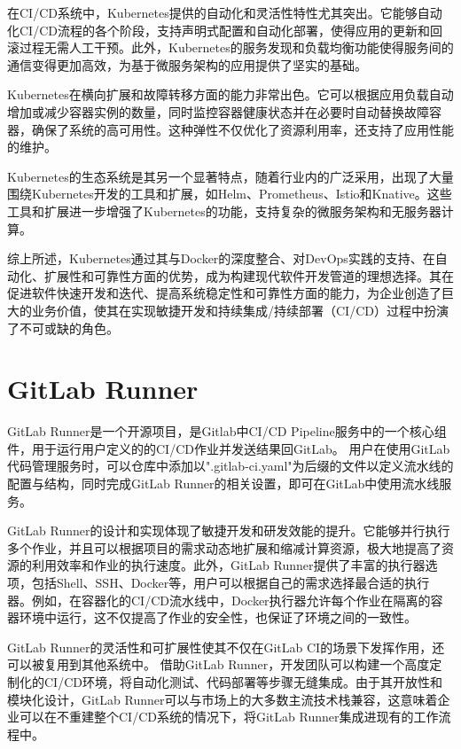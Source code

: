 在CI/CD系统中，Kubernetes提供的自动化和灵活性特性尤其突出\cite{janani2022analysis}。它能够自动化CI/CD流程的各个阶段，支持声明式配置和自动化部署，使得应用的更新和回滚过程无需人工干预。此外，Kubernetes的服务发现和负载均衡功能使得服务间的通信变得更加高效，为基于微服务架构的应用提供了坚实的基础。

Kubernetes在横向扩展和故障转移方面的能力非常出色\cite{JSSG201909023}。它可以根据应用负载自动增加或减少容器实例的数量，同时监控容器健康状态并在必要时自动替换故障容器，确保了系统的高可用性。这种弹性不仅优化了资源利用率，还支持了应用性能的维护。

Kubernetes的生态系统是其另一个显著特点，随着行业内的广泛采用，出现了大量围绕Kubernetes开发的工具和扩展，如Helm、Prometheus、Istio和Knative。这些工具和扩展进一步增强了Kubernetes的功能，支持复杂的微服务架构和无服务器计算。

综上所述，Kubernetes通过其与Docker的深度整合、对DevOps实践的支持、在自动化、扩展性和可靠性方面的优势，成为构建现代软件开发管道的理想选择。其在促进软件快速开发和迭代、提高系统稳定性和可靠性方面的能力，为企业创造了巨大的业务价值，使其在实现敏捷开发和持续集成/持续部署（CI/CD）过程中扮演了不可或缺的角色。


\section{GitLab Runner}
GitLab Runner是一个开源项目，是Gitlab中CI/CD Pipeline服务中的一个核心组件，用于运行用户定义的的CI/CD作业并发送结果回GitLab\cite{eguzo2023automating}。
用户在使用GitLab代码管理服务时，可以仓库中添加以".gitlab-ci.yaml"为后缀的文件以定义流水线的配置与结构，同时完成GitLab Runner的相关设置，即可在GitLab中使用流水线服务。

GitLab Runner的设计和实现体现了敏捷开发和研发效能的提升。它能够并行执行多个作业，并且可以根据项目的需求动态地扩展和缩减计算资源，极大地提高了资源的利用效率和作业的执行速度。此外，GitLab Runner提供了丰富的执行器选项，包括Shell、SSH、Docker等，用户可以根据自己的需求选择最合适的执行器。例如，在容器化的CI/CD流水线中，Docker执行器允许每个作业在隔离的容器环境中运行，这不仅提高了作业的安全性，也保证了环境之间的一致性。

GitLab Runner的灵活性和可扩展性使其不仅在GitLab CI的场景下发挥作用，还可以被复用到其他系统中。
借助GitLab Runner，开发团队可以构建一个高度定制化的CI/CD环境，将自动化测试、代码部署等步骤无缝集成。由于其开放性和模块化设计，GitLab Runner可以与市场上的大多数主流技术栈兼容，这意味着企业可以在不重建整个CI/CD系统的情况下，将GitLab Runner集成进现有的工作流程中。

